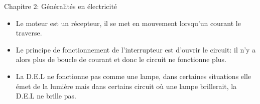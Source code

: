 \documentclass[24pt]{article}
\newcommand{\titre}{Chapitre 2: Généralités en électricité} %
\begin{document}
\thispagestyle{fancy}
\cfoot{}

\begin{titlebox}{\titre}
    \setlength\parindent{4pt} %
    \setlength\parskip{5pt} 

    \begin{itemize}
        \item Le moteur est un récepteur, il se met en mouvement lorsqu'un courant le traverse.
        \item Le principe de fonctionnement de 
        l'interrupteur est d'ouvrir le circuit: il n'y a alors plus de 
        boucle de courant et donc le circuit ne fonctionne plus.
        \item La D.E.L ne fonctionne pas comme une lampe, dans certaines situations 
        elle émet de la lumière mais dans certains circuit où une lampe brillerait, la D.E.L ne brille pas. 
    \end{itemize}
    
    
    \vspace{50pt}

\end{titlebox}
\end{document}
